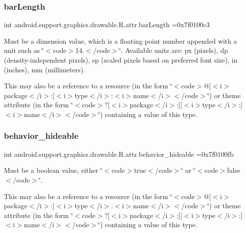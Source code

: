 \subsubsection{\texorpdfstring{bar\+Length}{barLength}}
{\footnotesize\ttfamily int android.\+support.\+graphics.\+drawable.\+R.\+attr.\+bar\+Length =0x7f0100c3\hspace{0.3cm}{\ttfamily [static]}}

Must be a dimension value, which is a floating point number appended with a unit such as \char`\"{}$<$code$>$14.\+5sp$<$/code$>$\char`\"{}. Available units are\+: px (pixels), dp (density-\/independent pixels), sp (scaled pixels based on preferred font size), in (inches), mm (millimeters). 

This may also be a reference to a resource (in the form \char`\"{}$<$code$>$@\mbox{[}$<$i$>$package$<$/i$>$\+:\mbox{]}$<$i$>$type$<$/i$>$\+:$<$i$>$name$<$/i$>$$<$/code$>$\char`\"{}) or theme attribute (in the form \char`\"{}$<$code$>$?\mbox{[}$<$i$>$package$<$/i$>$\+:\mbox{]}\mbox{[}$<$i$>$type$<$/i$>$\+:\mbox{]}$<$i$>$name$<$/i$>$$<$/code$>$\char`\"{}) containing a value of this type. \mbox{\label{classandroid_1_1support_1_1graphics_1_1drawable_1_1R_1_1attr_a94902114d7cec805e2ffb0a8ff363dfd}} 
\subsubsection{\texorpdfstring{behavior\+\_\+hideable}{behavior\_hideable}}
{\footnotesize\ttfamily int android.\+support.\+graphics.\+drawable.\+R.\+attr.\+behavior\+\_\+hideable =0x7f0100fb\hspace{0.3cm}{\ttfamily [static]}}

Must be a boolean value, either \char`\"{}$<$code$>$true$<$/code$>$\char`\"{} or \char`\"{}$<$code$>$false$<$/code$>$\char`\"{}. 

This may also be a reference to a resource (in the form \char`\"{}$<$code$>$@\mbox{[}$<$i$>$package$<$/i$>$\+:\mbox{]}$<$i$>$type$<$/i$>$\+:$<$i$>$name$<$/i$>$$<$/code$>$\char`\"{}) or theme attribute (in the form \char`\"{}$<$code$>$?\mbox{[}$<$i$>$package$<$/i$>$\+:\mbox{]}\mbox{[}$<$i$>$type$<$/i$>$\+:\mbox{]}$<$i$>$name$<$/i$>$$<$/code$>$\char`\"{}) containing a value of this type. \mbox{\label{classandroid_1_1support_1_1graphics_1_1drawable_1_1R_1_1attr_af424de802c79a406ea34cd8fec0ff25d}} 
